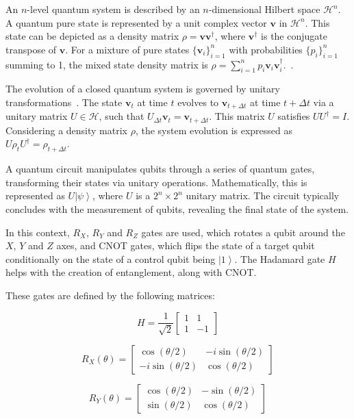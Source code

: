 \documentclass[12pt,a4paper]{report}
\begin{document}
An \(n\)-level quantum system is described by an \(n\)-dimensional Hilbert space \(\mathcal{H}^n\). A quantum pure state is represented by a unit complex vector \(\mathbf{v}\) in \(\mathcal{H}^n\). This state can be depicted as a density matrix \(\rho = \mathbf{v} \mathbf{v}^\dagger\), where \(\mathbf{v}^\dagger\) is the conjugate transpose of \(\mathbf{v}\). For a mixture of pure states \(\{ \mathbf{v}_i \}_{i=1}^n\) with probabilities \(\{ p_i \}_{i=1}^n\) summing to 1, the mixed state density matrix is \(\rho = \sum_{i=1}^n p_i \mathbf{v}_i \mathbf{v}_i^\dagger\).~\cite{fan2024Quantum}.

The evolution of a closed quantum system is governed by unitary transformations~\cite{nielsen2001quantum}. The state \(\mathbf{v}_t\) at time \(t\) evolves to \(\mathbf{v}_{t+\Delta t}\) at time \(t + \Delta t\) via a unitary matrix \(U \in \mathcal{H}\), such that \(U_{\Delta t} \mathbf{v}_t = \mathbf{v}_{t+\Delta t}\). This matrix \(U\) satisfies \(UU^\dagger = I\). Considering a density matrix \(\rho\), the system evolution is expressed as \(U \rho_t U^\dagger = \rho_{t+\Delta t}\).

A quantum circuit manipulates qubits through a series of quantum gates, transforming their states via unitary operations. Mathematically, this is represented as \(U \left| \psi \right\rangle\), where \(U\) is a \(2^n \times 2^n\) unitary matrix. The circuit typically concludes with the measurement of qubits, revealing the final state of the system.

In this context, $R_X$, $R_Y$ and $R_Z$ gates are used, which rotates a qubit around the $X$, $Y$ and $Z$ axes, and CNOT gates, which flips the state of a target qubit conditionally on the state of a control qubit being \(\left| 1 \right\rangle\). The Hadamard gate $H$ helps with the creation of entanglement, along with CNOT.

These gates are defined by the following matrices:

\[
  H = \frac{1}{\sqrt{2}} \begin{bmatrix}
    1 & 1  \\
    1 & -1
  \end{bmatrix}
\]

\[
  R_X(\theta) = \begin{bmatrix}
    \cos(\theta/2)   & -i\sin(\theta/2) \\
    -i\sin(\theta/2) & \cos(\theta/2)
  \end{bmatrix}
\]

\[
  R_Y(\theta) = \begin{bmatrix}
    \cos(\theta/2) & -\sin(\theta/2) \\
    \sin(\theta/2) & \cos(\theta/2)
  \end{bmatrix}
\]
\end{document}
